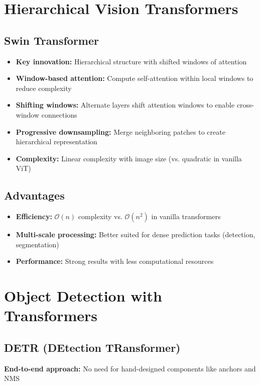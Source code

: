 \section{Hierarchical Vision Transformers}

\subsection*{Swin Transformer}
\begin{itemize}
    \item \textbf{Key innovation:} Hierarchical structure with shifted windows of attention
    \item \textbf{Window-based attention:} Compute self-attention within local windows to reduce complexity
    \item \textbf{Shifting windows:} Alternate layers shift attention windows to enable cross-window connections
    \item \textbf{Progressive downsampling:} Merge neighboring patches to create hierarchical representation
    \item \textbf{Complexity:} Linear complexity with image size (vs. quadratic in vanilla ViT)
\end{itemize}

\subsection*{Advantages}
\begin{itemize}
    \item \textbf{Efficiency:} $\mathcal{O}(n)$ complexity vs. $\mathcal{O}(n^2)$ in vanilla transformers
    \item \textbf{Multi-scale processing:} Better suited for dense prediction tasks (detection, segmentation)
    \item \textbf{Performance:} Strong results with less computational resources
\end{itemize}

\section{Object Detection with Transformers}

\subsection*{DETR (DEtection TRansformer)}
\textbf{End-to-end approach:} No need for hand-designed components like anchors and NMS

